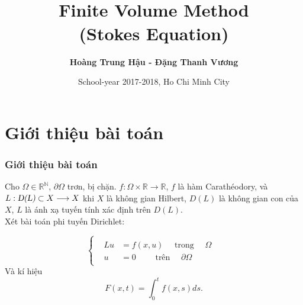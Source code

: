 \documentclass[11pt]{beamer}
\title[Finite Volume Method]{  \\{\bf\huge Finite Volume Method}\\(Stokes Equation)}   %
\author{\bf Hoàng Trung Hậu - Đặng Thanh Vương}                 %
\institute{\large \textcolor{red}{Finite Volume Method} } %
\date{ School-year 2017-2018, Ho Chi Minh City}
\numberwithin{equation}{section}
\theoremstyle{plain}
\theoremstyle{definition}
\theoremstyle{remark}
\begin{document}
\begin{frame}
\titlepage %
\end{frame}
\section{Giới thiệu bài toán}
\begin{frame}
\frametitle{Giới thiệu bài toán} %
Cho $\Omega\in\mathbb{R^{N}}$, $\partial \Omega$ trơn, bị chặn. $f:\Omega\times\mathbb{R}\longrightarrow \mathbb{R}$, $f$ là hàm Carathéodory, và $L:\textsl{D(L)}\subset X\longrightarrow X $ khi $X$ là không gian Hilbert, $D(L)$ là không gian con của $X$, $L$ là ánh xạ tuyến tính xác định trên $D(L)$.\\
Xét bài toán phi tuyến Dirichlet:

\[
\begin{cases}
\begin{array}{c}
\begin{aligned}
Lu&=f(x,u)\quad \text{ trong } \quad \Omega\\
u&=0 \qquad \text{ trên } \quad \partial\Omega
\end{aligned}
\end{array} 
\end{cases} 
\]
Và kí hiệu $$F(x,t)=\int_{0}^{t}f(x,s)ds.$$
\end{frame}


\end{document}
